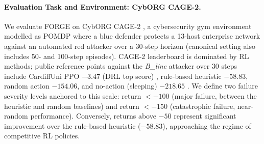 \documentclass[sigconf]{acmart}
\begin{document}
\paragraph{Evaluation Task and Environment: CybORG CAGE-2.}
We evaluate FORGE on CybORG CAGE-2 \citep{standen2021cyborg,kiely2023autonomous}, a cybersecurity gym environment modelled as POMDP where a blue defender protects a 13-host enterprise network against an automated red attacker over a 30-step horizon (canonical setting also includes 50- and 100-step episodes). CAGE-2 leaderboard is dominated by RL methods; public reference points against the \emph{B\_line} attacker over 30 steps include CardiffUni PPO $-3.47$ (DRL top score) \cite{cardiffuni_cage2_agent}, rule-based heuristic $-58.83$, random action $-154.06$, and no-action (sleeping) $-218.65$ \cite{kiely2023autonomous}. We define two failure severity levels anchored to this scale: return $<-100$ (major failure, between the heuristic and random baselines) and return $<-150$ (catastrophic failure, near-random performance). Conversely, returns above $-50$ represent significant improvement over the rule-based heuristic ($-58.83$), approaching the regime of competitive RL policies.
\end{document}

